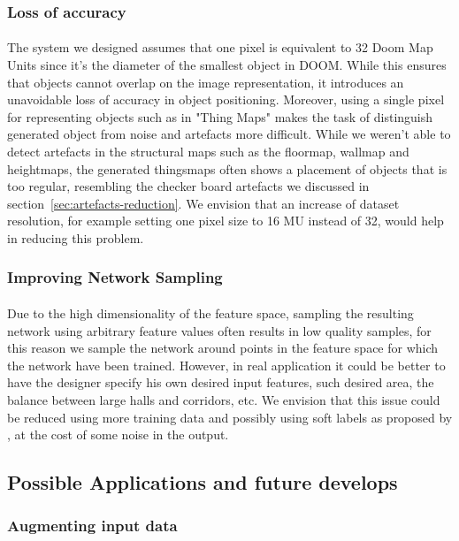 \subsubsection{Loss of accuracy}
\paragraph{} The system we designed assumes that one pixel is equivalent to 32 Doom Map Units since it's the diameter of the smallest object in DOOM. While this ensures that objects cannot overlap on the image representation, it introduces an unavoidable loss of accuracy in object positioning. Moreover, using a single pixel for representing objects such as in "Thing Maps" makes the task of distinguish generated object from noise and artefacts more difficult. While we weren't able to detect artefacts in the structural maps such as the floormap, wallmap and heightmaps, the generated \glspl{thingsmap} often shows a placement of objects that is too regular, resembling the checker board artefacts we discussed in section~\ref{sec:artefacts-reduction}. We envision that an increase of dataset resolution, for example setting one pixel size to 16 MU instead of 32, would help in reducing this problem. 

\subsubsection{Improving Network Sampling}
\label{sec:sampling}
\paragraph{} Due to the high dimensionality of the feature space, sampling the resulting network using arbitrary feature values often results in low quality samples, for this reason we sample the network around points in the feature space for which the network have been trained. However, in real application it could be better to have the designer specify his own desired input features, such desired area, the balance between large halls and corridors, etc. We envision that this issue could be reduced using more training data and possibly using soft labels as proposed by \cite{improved_gan}, at the cost of some noise in the output.

\subsection{Possible Applications and future develops}
\subsubsection{Augmenting input data}
\label{sec:data-augmentation}
